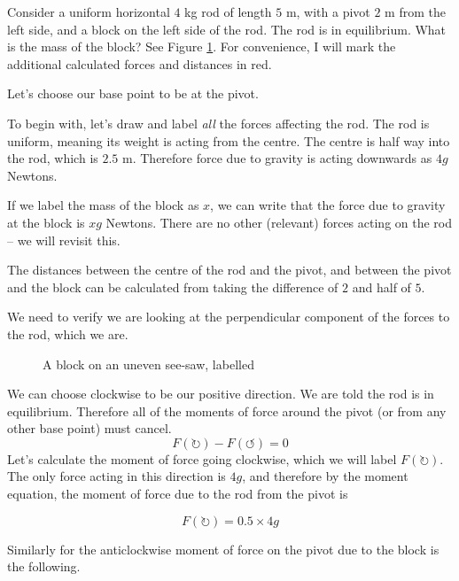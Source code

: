 \begin{example}
    Consider a uniform horizontal $4$ kg rod of length $5$ m, with a pivot $2$ m from the left side, and a block on the left side of the rod. The rod is in equilibrium. What is the mass of the block?
    See Figure \ref{fig:moment_uneven_seesaw_labelled}. For convenience, I will mark the additional calculated forces and distances in red.
\end{example}
\begin{solution}

    Let's choose our base point to be at the pivot.

    To begin with, let's draw and label \emph{all} the forces affecting the rod. 
    The rod is uniform, meaning its weight is acting from the centre. The centre is half way into the rod, which is $2.5$ m. Therefore force due to gravity is acting downwards 
    as $4g$ Newtons.

    If we label the mass of the block as $x$, we can write that the force due to gravity at the block is $xg$ Newtons. There are no other (relevant) forces acting on the rod -- we will revisit this.

    The distances between the centre of the rod and the pivot, and between the pivot and the block can be calculated from taking the difference of $2$ and half of $5$.

    We need to verify we are looking at the perpendicular component of the forces to the rod, which we are.

    \begin{figure}[H]
    \centering
    \caption{A block on an uneven see-saw, labelled}
    \label{fig:moment_uneven_seesaw_labelled}
    \end{figure}

    We can choose clockwise to be our positive direction. 
    We are told the rod is in equilibrium. Therefore all of the moments of force around the pivot (or from any other base point) must cancel.
    \[ F(\circlearrowright) - F(\circlearrowleft) = 0\]
    Let's calculate the moment of force going clockwise, which we will label $F(\circlearrowright)$. The only force acting in this direction is $4g$, and therefore by the moment equation, the moment of force due to the rod from the pivot is

    \[ F(\circlearrowright) = 0.5 \times 4g \]

    Similarly for the anticlockwise moment of force on the pivot due to the block is the following.


\end{solution}
